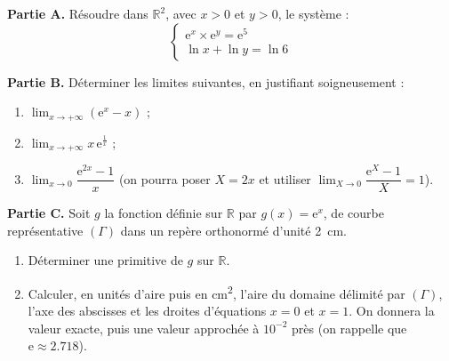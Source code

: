\documentclass[11pt]{article}
\begin{document}
\begin{exercice}
\textbf{Partie A.} Résoudre dans $\mathbb{R}^{2}$, avec $x > 0$ et $y > 0$, le système :
\[ \begin{cases} \mathrm{e}^{x}\times \mathrm{e}^{y} = \mathrm{e}^{5} \\ \ln x + \ln y = \ln 6 \end{cases} \]

\textbf{Partie B.} Déterminer les limites suivantes, en justifiant soigneusement :
\begin{enumerate}
\item $\displaystyle\lim_{x \to +\infty} \left(\mathrm{e}^{x} - x\right)$ ;
\item $\displaystyle\lim_{x \to +\infty} x\,\mathrm{e}^{\frac{1}{x}}$ ;
\item $\displaystyle\lim_{x \to 0} \dfrac{\mathrm{e}^{2x}-1}{x}$ (on pourra poser $X = 2x$ et utiliser $\displaystyle\lim_{X \to 0}\dfrac{\mathrm{e}^{X}-1}{X} = 1$).
\end{enumerate}

\textbf{Partie C.} Soit $g$ la fonction définie sur $\mathbb{R}$ par $g(x) = \mathrm{e}^{x}$, de courbe représentative $(\Gamma)$ dans un repère orthonormé d'unité \SI{2}{cm}.
\begin{enumerate}
\item Déterminer une primitive de $g$ sur $\mathbb{R}$.
\item Calculer, en unités d'aire puis en \si{cm^{2}}, l'aire du domaine délimité par $(\Gamma)$, l'axe des abscisses et les droites d'équations $x = 0$ et $x = 1$. On donnera la valeur exacte, puis une valeur approchée à $10^{-2}$ près (on rappelle que $\mathrm{e} \approx \num{2,718}$).
\end{enumerate}
\end{exercice}
\end{document}
